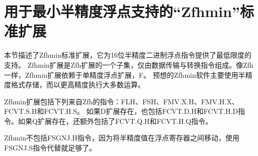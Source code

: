 \section{用于最小半精度浮点支持的“Zfhmin”标准扩展}

本节描述了Zfhmin标准扩展，它为16位半精度二进制浮点指令提供了最低限度的支持。
Zfhmin扩展是Zfh扩展的一个子集，仅由数据传输与转换指令组成。像Zfh一样，Zfhmin扩展依赖于单精度浮点扩展，F。
预想的Zfhmin软件主要使用半精度格式存储，而以更高精度执行大多数运算。

Zfhmin扩展包括下列来自Zfh的指令：FLH、FSH、FMV.X.H、FMV.H.X、FCVT.S.H和FCVT.H.S。
如果D扩展存在，也包括FCVT.D.H和FCVT.H.D指令。如果Q扩展存在，还额外包括了FCVT.Q.H和FCVT.H.Q指令。

\begin{commentary}
  Zfhmin不包括FSGNJ.H指令，因为将半精度值在浮点寄存器之间移动，使用FSGNJ.S指令代替就足够了。
\end{commentary}


